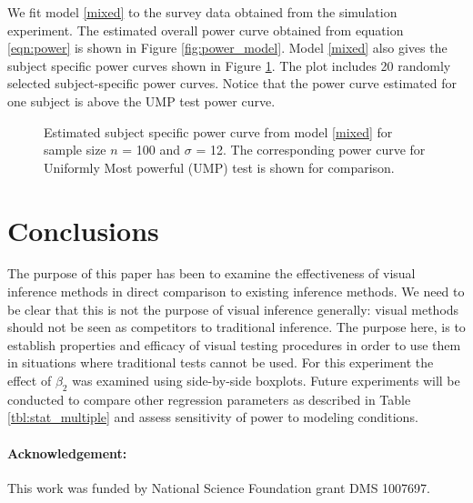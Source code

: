 \documentclass{article}
\begin{document}
We fit model \eqref{mixed} to the survey data obtained from the simulation experiment. The estimated overall power curve obtained from equation \eqref{eqn:power} is shown in Figure \ref{fig:power_model}. Model \ref{mixed} also gives the subject specific power curves shown in Figure \ref{fig:power_subject}. The plot includes 20 randomly selected subject-specific power curves. Notice that the power curve estimated for one subject is above the UMP test power curve. 

\begin{figure}[hbtp]
   \centering
       \caption{Estimated subject specific power curve from model \ref{mixed} for sample size $n$ = 100 and $\sigma$ = 12.  The corresponding power curve for Uniformly Most powerful (UMP) test is shown for comparison.}
       \label{fig:power_subject}
\end{figure}


\section{Conclusions}

The purpose of this paper has been to examine the effectiveness of visual inference methods in direct comparison to existing inference methods. We need to be clear that this is not the purpose of visual inference generally: visual methods should not be seen as competitors to traditional inference.  The purpose here, is to  establish properties and  efficacy of visual testing procedures in order to use them in situations where traditional tests cannot be used. For this experiment the effect of $\beta_2$ was examined using side-by-side boxplots. Future experiments will be conducted to compare other regression parameters as described in Table \ref{tbl:stat_multiple} and assess sensitivity of power to modeling conditions.

\paragraph{Acknowledgement:}

This work was funded by National Science Foundation grant DMS 1007697.

%
%

%


\end{document}

